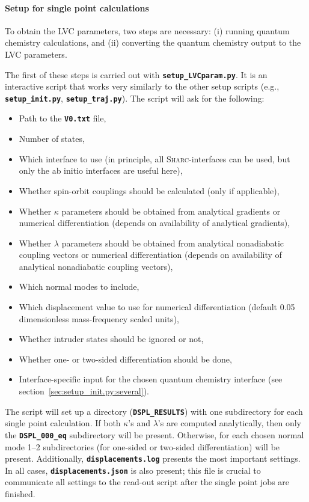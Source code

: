 \documentclass[a4paper,10pt,DIV=15,openany]{scrbook}
\newcommand{\sharc}{\textsc{Sharc}}
\newcommand{\ttt}[1]{\textbf{\texttt{#1}}}
\begin{document}
\paragraph{Setup for single point calculations}

To obtain the LVC parameters, two steps are necessary: (i) running quantum chemistry calculations, and (ii) converting the quantum chemistry output to the LVC parameters.

The first of these steps is carried out with \ttt{setup\_LVCparam.py}.
It is an interactive script that works very similarly to the other setup scripts (e.g., \ttt{setup\_init.py}, \ttt{setup\_traj.py}).
The script will ask for the following:
\begin{itemize}
  \item Path to the \ttt{V0.txt} file,
  \item Number of states,
  \item Which interface to use (in principle, all \sharc-interfaces can be used, but only the ab initio interfaces are useful here),
  \item Whether spin-orbit couplings should be calculated (only if applicable),
  \item Whether $\kappa$ parameters should be obtained from analytical gradients or numerical differentiation (depends on availability of analytical gradients),
  \item Whether $\lambda$ parameters should be obtained from analytical nonadiabatic coupling vectors or numerical differentiation (depends on availability of analytical nonadiabatic coupling vectors),
  \item Which normal modes to include,
  \item Which displacement value to use for numerical differentiation (default 0.05 dimensionless mass-frequency scaled units),
  \item Whether intruder states should be ignored or not,
  \item Whether one- or two-sided differentiation should be done,
  \item Interface-specific input for the chosen quantum chemistry interface (see section~\ref{sec:setup_init.py:several}).
\end{itemize}
The script will set up a directory (\ttt{DSPL\_RESULTS}) with one subdirectory for each single point calculation.
If both $\kappa$'s and $\lambda$'s are computed analytically, then only the \ttt{DSPL\_000\_eq} subdirectory will be present.
Otherwise, for each chosen normal mode 1--2 subdirectories (for one-sided or two-sided differentiation) will be present.
Additionally, \ttt{displacements.log} presents the most important settings.
In all cases, \ttt{displacements.json} is also present; this file is crucial to communicate all settings to the read-out script after the single point jobs are finished.
\end{document}
